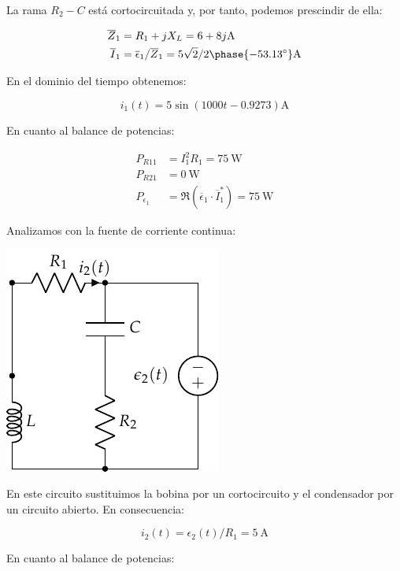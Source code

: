 La rama $R_2 - C$ está cortocircuitada y, por tanto, podemos prescindir de ella:

\begin{align*}
  \overline{Z}_1 &= R_1 + jX_L = 6 + 8j\si{\ampere}\\
  \overline{I}_1 &= \overline{\epsilon}_1 / \overline{Z}_1 = 5\sqrt{2}/2\phase{\ang{-53.13}}\si{\ampere}
\end{align*}

En el dominio del tiempo obtenemos:

\begin{equation*}
  i_1(t) = 5\sin(1000t - 0.9273)\si{\ampere}
\end{equation*}

En cuanto al balance de potencias:

\begin{align*}
  P_{R11} &= I_1^2 R_1 = \qty{75}{\watt}\\
  P_{R21} &= \qty{0}{\watt}\\
  P_{\epsilon_1} &= \Re(\overline{\epsilon}_1 \cdot \overline{I}_1^*) = \qty{75}{\watt}
\end{align*}

Analizamos con la fuente de corriente continua:

\begin{center}
\includegraphics{figuras/superposicion1_DC}
\end{center}

En este circuito sustituimos la bobina por un cortocircuito y el condensador por un circuito abierto. En consecuencia:

\begin{equation*}
  i_2(t) = \epsilon_2(t) / R_1 = \qty{5}{\ampere}
\end{equation*}

En cuanto al balance de potencias:

